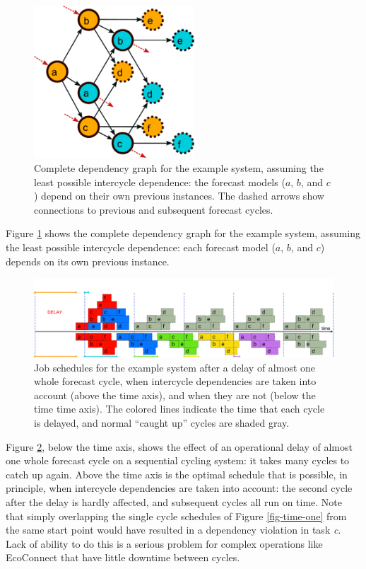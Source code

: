 \documentclass[11pt,a4paper]{article}
\begin{document}
\begin{figure} \begin{center}
    \includegraphics[width=6cm]{dependencies-two} \end{center}
    \caption{\small Complete dependency graph for the example
    system, assuming the least possible intercycle dependence: the
    forecast models ($a$, $b$, and $c$) depend on their own previous
    instances. The dashed arrows show connections to previous and
    subsequent forecast cycles.} 
    \label{fig-dep-two}
\end{figure}

Figure \ref{fig-dep-two} shows the complete dependency graph for the
example system, assuming the least possible intercycle dependence: each
forecast model ($a$, $b$, and $c$) depends on its own previous instance.

\begin{figure} 
    \begin{center} 
        \includegraphics[width=12cm]{timeline-three}
    \end{center} 
    \caption{\small Job schedules for the example system after a delay
    of almost one whole forecast cycle, when intercycle dependencies are
    taken into account (above the time axis), and when they are not
    (below the time time axis). The colored lines indicate the time that
    each cycle is delayed, and normal ``caught up'' cycles
    are shaded gray.} 
    \label{fig-time-three}
\end{figure} 

Figure \ref{fig-time-three}, below the time axis, shows the effect of an
operational delay of almost one whole forecast cycle on a sequential
cycling system: it takes many cycles to catch up again. Above the time
axis is the optimal schedule that is possible, in principle, when
intercycle dependencies are taken into account: the second cycle after
the delay is hardly affected, and subsequent cycles all run on time.
Note that simply overlapping the single cycle schedules of Figure
\ref{fig-time-one} from the same start point would have resulted in a
dependency violation in task {\em c}.  Lack of ability to do this is a
serious problem for complex operations like EcoConnect that have little
downtime between cycles. 
\end{document}
